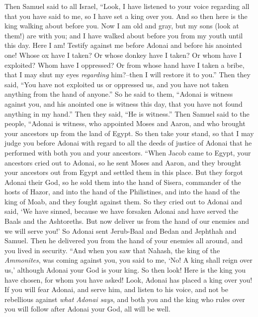 \begin{biblechapter} %
 Then Samuel said to all Israel, “Look, I have listened to your voice regarding all that you have said to me, so I have set a king over you.
\verse And so then here is the king walking about before you. Now I am old and gray, but my sons (look at them!) are with you; and I have walked about before you from my youth until this day.
\verse Here I am! Testify against me before Adonai and before his anointed one! Whose ox have I taken? Or whose donkey have I taken? Or whom have I exploited? Whom have I oppressed? Or from whose hand have I taken a bribe, that I may shut my eyes \textit{regarding} him?–then I will restore it to you.”
\verse Then they said, “You have not exploited us or oppressed us, and you have not taken anything from the hand of anyone.”
\verse So he said to them, “Adonai is witness against you, and his anointed one is witness this day, that you have not found anything in my hand.” Then they said, “He is witness.”
\verse Then Samuel said to the people, “Adonai is witness, who appointed Moses and Aaron, and who brought your ancestors up from the land of Egypt.
\verse So then take your stand, so that I may judge you before Adonai with regard to all the deeds of justice of Adonai that he performed with both you and your ancestors.
\verse “When Jacob came to Egypt, your ancestors cried out to Adonai, so he sent Moses and Aaron, and they brought your ancestors out from Egypt and settled them in this place.
\verse But they forgot Adonai their God, so he sold them into the hand of Sisera, commander of the hosts of Hazor, and into the hand of the Philistines, and into the hand of the king of Moab, and they fought against them.
\verse So they cried out to Adonai and said, ‘We have sinned, because we have forsaken Adonai and have served the Baals and the Ashtoreths. But now deliver us from the hand of our enemies and we will serve you!’
\verse So Adonai sent Jerub-Baal and Bedan and Jephthah and Samuel. Then he delivered you from the hand of your enemies all around, and you lived in security.
\verse “And when you saw that Nahash, the king of the \textit{Ammonites}, was coming against you, you said to me, ‘No! A king shall reign over us,’ although Adonai your God is your king.
\verse So then look! Here is the king you have chosen, for whom you have asked! Look, Adonai has placed a king over you!
\verse If you will fear Adonai, and serve him, and listen to his voice, and not be rebellious against \textit{what Adonai says}, and both you and the king who rules over you will follow after Adonai your God, all will be well.

\end{biblechapter}
